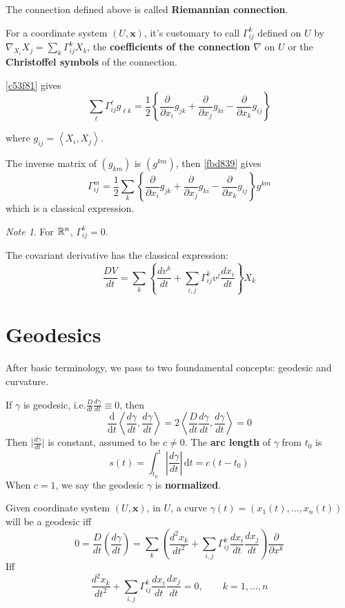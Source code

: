 \documentclass{amsart}
\let\originalmathbb\mathbb
\renewcommand{\mathbb}[1]{%
    \ifstrequal{#1}{1}{\mathbbm{#1}}{\originalmathbb{#1}}%
}
\theoremstyle{plain}
\theoremstyle{definition}
\theoremstyle{remark}
\newtheorem{note}[theorem]{Note}
\begin{document}
The connection defined above is called \textbf{Riemannian connection}.

For a coordinate system $(U,\mathbf{x})$, it's customary to call $\Gamma^{k}_{ij}$ defined on $U$ by $\nabla_{X_i}X_j=\sum _k\Gamma^{k}_{ij}X_k$, the \textbf{coefficients of the connection} $\nabla$ on $U$ or the \textbf{Christoffel symbols} of the connection.

\cref{c53f81} gives
\begin{equation}
\sum_{\ell} \Gamma_{i j}^{\ell} g_{\ell k}=\frac{1}{2}\left\{\frac{\partial}{\partial x_i} g_{j k}+\frac{\partial}{\partial x_j} g_{k i}-\frac{\partial}{\partial x_k} g_{i j}\right\}
\label{fbd839}
\end{equation}

where $g_{ij}= \left< X_i,X_j \right>$.

The inverse matrix of $(g_{km})$ is $(g^{km})$, then \cref{fbd839} gives
\[
\Gamma^{m}_{ij}=\frac{1}{2}\sum _k\left\{\frac{\partial}{\partial x_i} g_{j k}+\frac{\partial}{\partial x_j} g_{k i}-\frac{\partial}{\partial x_k} g_{i j}\right\}g^{km}
\]
which is a classical expression.

\begin{note}
For $\mathbb{R}^{n}$, $\Gamma^{k}_{ij}=0$.
\end{note}
The covariant derivative has the classical expression:
\[
\frac{D V}{d t}=\sum_k\left\{\frac{d v^k}{d t}+\sum_{i, j} \Gamma_{i j}^k v^j \frac{d x_i}{d t}\right\} X_k
\]
\section{Geodesics}

After basic terminology, we pass to two foundamental concepts: geodesic and curvature.

If $\gamma$ is geodesic, i.e.$\frac{D}{dt }\frac{d\gamma}{dt}\equiv0$, then
\[
\frac{\mathrm{d}}{\mathrm{d}t} \left< \frac{d\gamma}{dt},\frac{d\gamma}{dt} \right> =2\left< \frac{D}{dt }\frac{d\gamma}{dt},\frac{d\gamma}{dt} \right>=0
\]
Then $\lvert \frac{d\gamma}{dt} \rvert$ is constant, assumed to be $c\neq0$. The \textbf{arc length} of $\gamma$ from $t_0$ is
\[
s(t)=\int_{t_0}^{t} \left\lvert  \frac{d\gamma}{dt}  \right\rvert  \, \mathrm{d}t =c(t-t_0)
\]
When $c=1$, we say the geodesic $\gamma$ is \textbf{normalized}.

Given coordinate system $(U,\mathbf{x})$, in $U$, a curve $\gamma(t)=(x_1(t),\dots,x_n(t))$ will be a geodesic iff
\[
0=\frac{D}{dt }\left( \frac{d\gamma}{dt } \right)=\sum _k\left( \frac{d^{2}x_k}{dt^{2} }+\sum_{i,j}\Gamma^{k}_{ij} \frac{dx_i}{dt }\frac{dx_j}{dt }\right)\frac{\partial}{\partial x^{k}}
\]
Iff
\begin{equation}
\frac{d^{2}x_k}{dt^{2} }+\sum_{i,j}\Gamma^{k}_{ij} \frac{dx_i}{dt }\frac{dx_j}{dt }=0,\qquad k=1,\dots,n
\label{ec1f88}
\end{equation}
\end{document}

